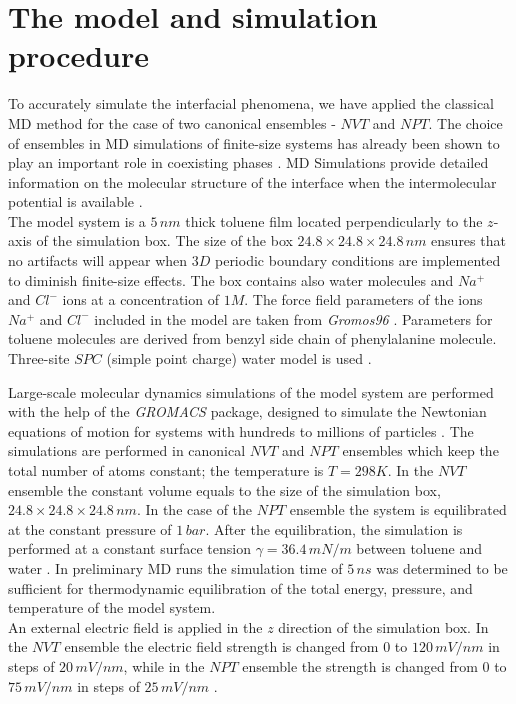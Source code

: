 \section{The model and simulation procedure}

To accurately simulate the interfacial phenomena, we have applied the classical MD method for the case of two canonical ensembles - $NVT$  and  $NPT$. The choice of ensembles in MD simulations of finite-size systems has already been shown to play an important role in coexisting phases \cite{Pisov_2001}. MD Simulations provide detailed information on the molecular structure of the interface when the intermolecular potential is available \cite{Koplik,Koplik2014,Pisov_2012}.\\

The model system is a $5\, nm$ thick toluene film located perpendicularly to the $z$-axis  of the simulation box. The size of the box  $24.8 \times 24.8 \times 24.8\, nm$ ensures that no artifacts will appear when $3D$ periodic boundary conditions are implemented to diminish finite-size effects. The box contains also  water molecules and $Na^+$ and $Cl^-$ ions at a concentration of $1M$.  The force field parameters of the  ions $Na^+$ and $Cl^-$ included in the model are  taken from {\it Gromos96}  \cite{doi:10.1021/jp984217f}. Parameters for toluene molecules are derived from  benzyl side chain of phenylalanine molecule. Three-site $SPC$ (simple point charge) water model is used \cite{doi:10.1021/j100308a038}.

Large-scale molecular dynamics simulations of the model system are performed with the help of the  {\it GROMACS} package, designed to simulate the Newtonian equations of motion for systems with hundreds to millions of particles \cite{Berendsen199543}. The simulations are performed in  canonical $NVT$  and  $NPT$ ensembles which keep the total number of atoms constant; the temperature is $T = 298 K$.  In the $NVT$ ensemble the constant volume equals to the size of the simulation box, $24.8 \times 24.8 \times 24.8\, nm$. In the case of the $NPT$ ensemble the system is equilibrated at the constant pressure of $1\, bar$. After the equilibration, the simulation is performed at a constant surface tension $\gamma = 36.4\, mN/m$ between toluene and water \cite{Drelich_2002}. 
 In preliminary MD runs the  simulation time of  $5\, ns$ was determined to be sufficient for  thermodynamic equilibration of the total energy,  pressure, and temperature of the model system.\\
 An external electric field is applied  in the $z$ direction of the simulation box. In the $NVT$ ensemble the electric field strength is changed from $0$ to $120\, mV/nm$ in steps of $20\, mV/nm$,  while in the $NPT$ ensemble the strength is changed   from $0$ to $75\, mV/nm$ in steps of $25\, mV/nm$ .